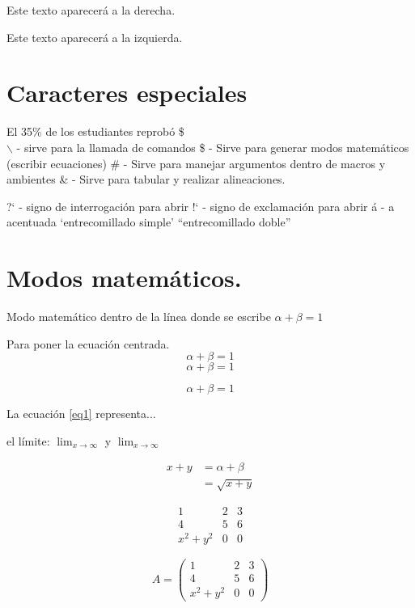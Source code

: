 \documentclass[]{article}
\begin{document}
\begin{flushright}
	Este texto aparecerá a la derecha.
\end{flushright}

\begin{flushleft}
	Este texto aparecerá a la izquierda.
\end{flushleft}

\section{Caracteres especiales}
El 35\% de los estudiantes reprobó \$ \\

$\backslash$ - sirve para la llamada de comandos
\$ - Sirve para generar modos matemáticos (escribir ecuaciones)
\# - Sirve para manejar argumentos dentro de macros y ambientes
\& - Sirve para tabular y realizar alineaciones. 

?` - signo de interrogación para abrir
!` - signo de exclamación para abrir
\'a - a acentuada
`entrecomillado simple'
``entrecomillado doble''

\section{Modos matemáticos.}
Modo matemático dentro de la línea donde se escribe $\alpha + \beta = 1$

Para poner la ecuación centrada. 
$$
	\alpha + \beta = 1
$$
\[
\alpha + \beta = 1
\]

\begin{equation*}
	\alpha + \beta = 1 \label{eq1}
\end{equation*}

La ecuación \ref{eq1} representa...

el límite:  $\lim_{x\rightarrow \infty}$ y $\displaystyle{\lim_{x\rightarrow \infty}}$
 
 \begin{align*}
 	x+y & = \alpha + \beta \\
 	& =\sqrt{x+y}
 \end{align*}

\[
\begin{array}{lcc}
	1 & 2 & 3 \\
	4 & 5 & 6 \\
	x^2 + y^2 &0 &0
\end{array}
\]

\[
A = \left(\begin{array}{lcc}
	1 & 2 & 3 \\
	4 & 5 & 6 \\
	x^2 + y^2 &0 &0
\end{array}\right)
\]
\end{document}
